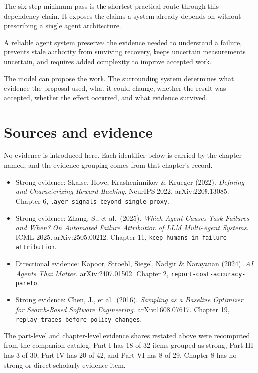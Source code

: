 The six-step minimum pass is the shortest practical route through this dependency chain. It exposes the claims a system already depends on without prescribing a single agent architecture.

A reliable agent system preserves the evidence needed to understand a failure, prevents stale authority from surviving recovery, keeps uncertain measurements uncertain, and requires added complexity to improve accepted work.

The model can propose the work. The surrounding system determines what evidence the proposal used, what it could change, whether the result was accepted, whether the effect occurred, and what evidence survived.

\section*{Sources and evidence}

No evidence is introduced here. Each identifier below is carried by the chapter named, and the evidence grouping comes from that chapter's record.

\begin{itemize}
\tightlist
\item
  Strong evidence: Skalse, Howe, Krasheninnikov \& Krueger (2022). \emph{Defining and Characterizing Reward Hacking}. NeurIPS 2022. arXiv:2209.13085. Chapter 6, \texttt{layer-signals-beyond-single-proxy}.
\item
  Strong evidence: Zhang, S., et al.~(2025). \emph{Which Agent Causes Task Failures and When? On Automated Failure Attribution of LLM Multi-Agent Systems}. ICML 2025. arXiv:2505.00212. Chapter 11, \texttt{keep-humans-in-failure-attribution}.
\item
  Directional evidence: Kapoor, Stroebl, Siegel, Nadgir \& Narayanan (2024). \emph{AI Agents That Matter}. arXiv:2407.01502. Chapter 2, \texttt{report-cost-accuracy-pareto}.
\item
  Strong evidence: Chen, J., et al.~(2016). \emph{Sampling as a Baseline Optimizer for Search-Based Software Engineering}. arXiv:1608.07617. Chapter 19, \texttt{replay-traces-before-policy-changes}.
\end{itemize}

The part-level and chapter-level evidence shares restated above were recomputed from the companion catalog: Part I has 18 of 32 items grouped as strong, Part III has 3 of 30, Part IV has 20 of 42, and Part VI has 8 of 29. Chapter 8 has no strong or direct scholarly evidence item.
